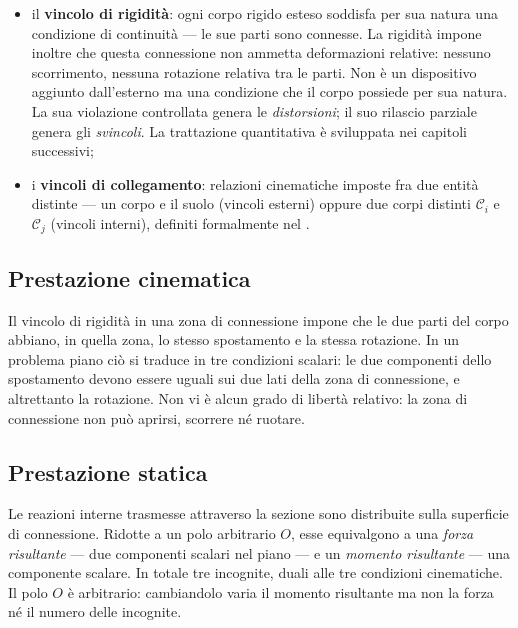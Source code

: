 \begin{itemize}[nosep]
	\item il \textbf{vincolo di rigidità}: ogni corpo
	rigido esteso soddisfa per sua natura una
	condizione di continuità --- le sue parti sono
	connesse. La rigidità impone inoltre che questa
	connessione non ammetta deformazioni relative:
	nessuno scorrimento, nessuna rotazione relativa
	tra le parti. Non è un dispositivo aggiunto
	dall'esterno ma una condizione che il corpo
	possiede per sua natura. La sua violazione
	controllata genera le \emph{distorsioni}; il
	suo rilascio parziale genera gli
	\emph{svincoli}. La trattazione quantitativa
	è sviluppata nei capitoli successivi;
	\item i \textbf{vincoli di collegamento}:
	relazioni cinematiche imposte fra due entità
	distinte --- un corpo e il suolo (vincoli
	esterni) oppure due corpi distinti
	$\mathcal{C}_i$ e $\mathcal{C}_j$ (vincoli
	interni), definiti formalmente nel
	.
\end{itemize}



\subsection{Prestazione cinematica}

Il vincolo di rigidità in una zona di connessione impone che le due parti del corpo abbiano, in quella zona, lo stesso spostamento e la stessa rotazione. In un problema piano	ciò si traduce in tre condizioni scalari: le due componenti	dello spostamento devono essere uguali sui due lati della zona di connessione, e altrettanto la rotazione. Non vi è alcun grado	di libertà relativo: la zona di connessione non può aprirsi, scorrere né ruotare.

\subsection{Prestazione statica}

Le reazioni interne trasmesse attraverso la sezione sono
distribuite sulla superficie di connessione. Ridotte a un
polo arbitrario $O$, esse equivalgono a una
\emph{forza risultante} --- due componenti scalari nel
piano --- e un \emph{momento risultante} --- una componente
scalare. In totale tre incognite, duali alle tre condizioni
cinematiche. Il polo $O$ è arbitrario: cambiandolo varia
il momento risultante ma non la forza né il numero delle
incognite.

